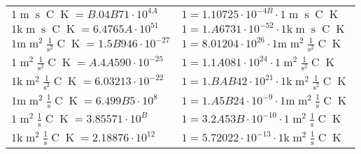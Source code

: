 \begin{center}
\begin{longtable}{l l}
{\color{black}$1 \bm{\mathrm{ }}{\operatorname{m}}{\operatorname{s}}{\operatorname{C}}{\operatorname{K}} = B.04B71\cdot10^{4A} $}   & {\color{black}$ 1 = 1.10725\cdot10^{-4B} \cdot 1 \bm{\mathrm{ }}{\operatorname{m}}{\operatorname{s}}{\operatorname{C}}{\operatorname{K}}$}  \\
{\color{gray}$1 \bm{\mathrm{ k}}{\operatorname{m}}{\operatorname{s}}{\operatorname{C}}{\operatorname{K}} = 6.4765A\cdot10^{51} $}   & {\color{gray}$ 1 = 1.A6731\cdot10^{-52} \cdot 1 \bm{\mathrm{ k}}{\operatorname{m}}{\operatorname{s}}{\operatorname{C}}{\operatorname{K}}$}  \\
{\color{gray}$1 \bm{\mathrm{ m}}{\operatorname{m}^2}\frac1{\operatorname{s}^2}{\operatorname{C}}{\operatorname{K}} = 1.5B946\cdot10^{-27} $}   & {\color{gray}$ 1 = 8.01204\cdot10^{26} \cdot 1 \bm{\mathrm{ m}}{\operatorname{m}^2}\frac1{\operatorname{s}^2}{\operatorname{C}}{\operatorname{K}}$}  \\
{\color{black}$1 \bm{\mathrm{ }}{\operatorname{m}^2}\frac1{\operatorname{s}^2}{\operatorname{C}}{\operatorname{K}} = A.4A590\cdot10^{-25} $}   & {\color{black}$ 1 = 1.1A081\cdot10^{24} \cdot 1 \bm{\mathrm{ }}{\operatorname{m}^2}\frac1{\operatorname{s}^2}{\operatorname{C}}{\operatorname{K}}$}  \\
{\color{gray}$1 \bm{\mathrm{ k}}{\operatorname{m}^2}\frac1{\operatorname{s}^2}{\operatorname{C}}{\operatorname{K}} = 6.03213\cdot10^{-22} $}   & {\color{gray}$ 1 = 1.BAB42\cdot10^{21} \cdot 1 \bm{\mathrm{ k}}{\operatorname{m}^2}\frac1{\operatorname{s}^2}{\operatorname{C}}{\operatorname{K}}$}  \\
{\color{gray}$1 \bm{\mathrm{ m}}{\operatorname{m}^2}\frac1{\operatorname{s}}{\operatorname{C}}{\operatorname{K}} = 6.499B5\cdot10^{8} $}   & {\color{gray}$ 1 = 1.A5B24\cdot10^{-9} \cdot 1 \bm{\mathrm{ m}}{\operatorname{m}^2}\frac1{\operatorname{s}}{\operatorname{C}}{\operatorname{K}}$}  \\
{\color{black}$1 \bm{\mathrm{ }}{\operatorname{m}^2}\frac1{\operatorname{s}}{\operatorname{C}}{\operatorname{K}} = 3.85571\cdot10^{B} $}   & {\color{black}$ 1 = 3.2A53B\cdot10^{-10} \cdot 1 \bm{\mathrm{ }}{\operatorname{m}^2}\frac1{\operatorname{s}}{\operatorname{C}}{\operatorname{K}}$}  \\
{\color{gray}$1 \bm{\mathrm{ k}}{\operatorname{m}^2}\frac1{\operatorname{s}}{\operatorname{C}}{\operatorname{K}} = 2.18876\cdot10^{12} $}   & {\color{gray}$ 1 = 5.72022\cdot10^{-13} \cdot 1 \bm{\mathrm{ k}}{\operatorname{m}^2}\frac1{\operatorname{s}}{\operatorname{C}}{\operatorname{K}}$}  \\

\end{longtable}
\end{center}
